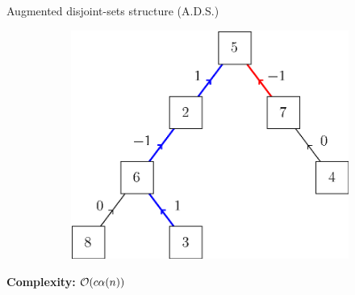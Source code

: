 \begin{frame}{Augmented disjoint-sets structure (A.D.S.)}
\begin{figure}
\begin{subfigure}{0.45\textwidth}
			\includegraphics[width=\linewidth]{ds/augmented_disjoint_link}
		\end{subfigure}%
	\end{figure}
	\textbf{Complexity:} $\mathcal{O}(c \alpha(n))$
\end{frame}

